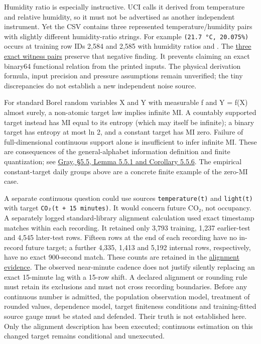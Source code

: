Humidity ratio is especially instructive. UCI calls it derived from temperature and relative humidity, so it must not be advertised as another independent instrument. Yet the CSV contains three represented temperature/humidity pairs with slightly different humidity-ratio strings. For example \texttt{(21.7\ °C,\ 20.075\%)} occurs at training row IDs 2,584 and 2,585 with humidity ratios \mbox{} and \mbox{}. The \href{https://github.com/sepahead/pid-rs/blob/main/audit/evidence/real-occupancy-sensors-example-2026-09-08/humidity-ratio-negative-witnesses.json}{three exact witness pairs} preserve that negative finding. It prevents claiming an exact binary64 functional relation from the printed inputs. The physical derivation formula, input precision and pressure assumptions remain unverified; the tiny discrepancies do not establish a new independent noise source.

For standard Borel random variables X and Y with measurable f and Y = f(X) almost surely, a non-atomic target law implies infinite MI. A countably supported target instead has MI equal to its entropy (which may itself be infinite); a binary target has entropy at most ln 2, and a constant target has MI zero. Failure of full-dimensional continuous support alone is insufficient to infer infinite MI. These are consequences of the general-alphabet information definition and finite quantization; see \href{https://ee.stanford.edu/~gray/it.pdf}{Gray, §5.5, Lemma 5.5.1 and Corollary 5.5.6}. The empirical constant-target daily groups above are a concrete finite example of the zero-MI case.

A separate continuous question could use sources \texttt{temperature(t)} and \texttt{light(t)} with target \texttt{CO₂(t\ +\ 15\ minutes)}. It would concern future CO₂, not occupancy. A separately logged standard-library alignment calculation used exact timestamp matches within each recording. It retained only 3,793 training, 1,237 earlier-test and 4,545 later-test rows. Fifteen rows at the end of each recording have no in-record future target; a further 4,335, 1,413 and 5,192 internal rows, respectively, have no exact 900-second match. These counts are retained in the \href{https://github.com/sepahead/pid-rs/blob/main/audit/evidence/real-occupancy-sensors-example-2026-09-08/future-co2-alignment.json}{alignment evidence}. The observed near-minute cadence does not justify silently replacing an exact 15-minute lag with a 15-row shift. A declared alignment or rounding rule must retain its exclusions and must not cross recording boundaries. Before any continuous number is admitted, the population observation model, treatment of rounded values, dependence model, target finiteness conditions and training-fitted source gauge must be stated and defended. Their truth is not established here. Only the alignment description has been executed; continuous estimation on this changed target remains conditional and unexecuted.

